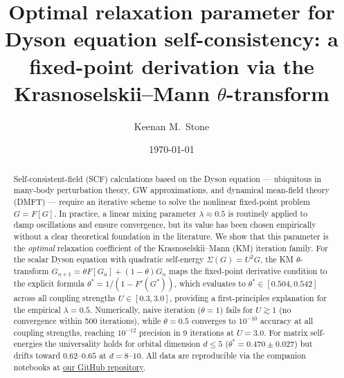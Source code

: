 \documentclass[aps,prb,twocolumn,superscriptaddress,nofootinbib,longbibliography,floatfix]{revtex4-2}
\newcommand{\optparam}{\theta^{*}}
\newcommand{\Gstar}{G^{*}}
\theoremstyle{plain}
\theoremstyle{remark}
\begin{document}

\title{Optimal relaxation parameter for Dyson equation
       self-consistency: a fixed-point derivation via the
       \mbox{Krasnoselskii--Mann} $\theta$-transform}

\author{Keenan M.~Stone}

\date{\today}

\begin{abstract}
Self-consistent-field (SCF) calculations based on the Dyson
equation — ubiquitous in many-body perturbation theory,
GW approximations, and dynamical mean-field theory (DMFT) —
require an iterative scheme to solve the nonlinear fixed-point
problem $G = F[G]$.  In practice, a linear mixing parameter
$\lambda \approx 0.5$ is routinely applied to damp oscillations
and ensure convergence, but its value has been chosen
empirically without a clear theoretical foundation in the literature.
We show that this parameter is the \emph{optimal} relaxation
coefficient of the Krasnoselskii--Mann (KM) iteration family.
For the scalar Dyson equation with quadratic self-energy
$\Sigma(G) = U^2 G$, the KM $\theta$-transform
$G_{n+1} = \theta F[G_n] + (1-\theta)G_n$
maps the fixed-point derivative condition to the explicit
formula $\optparam = 1/(1 - F'(\Gstar))$, which evaluates to
$\theta^* \in [0.504, 0.542]$ across all coupling strengths
$U \in [0.3, 3.0]$, providing a first-principles explanation
for the empirical $\lambda = 0.5$.
Numerically, naive iteration ($\theta = 1$) fails for $U \gtrsim 1$
(no convergence within 500 iterations), while $\theta = 0.5$ converges
to $10^{-10}$ accuracy at all coupling strengths, reaching
$10^{-12}$ precision in 9 iterations at $U = 3.0$.
For matrix self-energies the universality holds for orbital
dimension $d \leq 5$ ($\theta^* = 0.470 \pm 0.027$) but drifts
toward $0.62$--$0.65$ at $d = 8$--$10$.
All data are reproducible via the companion notebooks at
\href{https://github.com/Keenan-M-Stone/Petrification}{our GitHub repository}.
\end{abstract}


\maketitle
\end{document}
